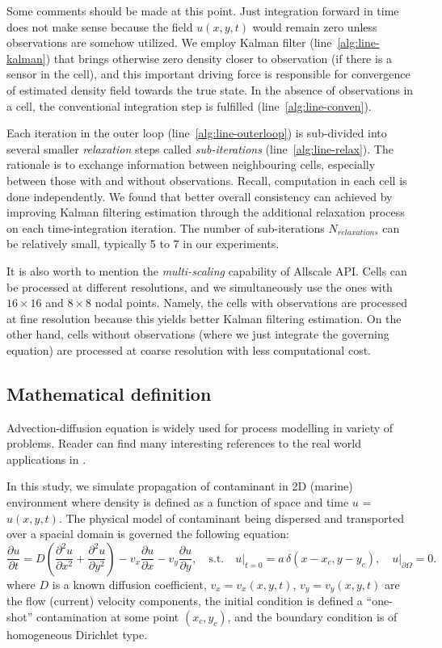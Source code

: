 \documentclass[acmsmall,review,anonymous]{acmart}\settopmatter{printfolios=true,printccs=false,printacmref=false}
\begin{document}
Some comments should be made at this point. Just integration forward in time does not make sense because the field $u(x,y,t)$ would remain zero unless observations are somehow utilized.
We employ Kalman filter (line~\ref{alg:line-kalman}) that brings otherwise zero density closer to observation (if there is a sensor in the cell), and this important driving force is responsible for convergence of estimated density field towards the true state. In the absence of observations in a cell, the conventional integration step is fulfilled (line~\ref{alg:line-conven}).

Each iteration in the outer loop (line~\ref{alg:line-outerloop}) is sub-divided into several smaller \textit{relaxation} steps called \textit{sub-iterations} (line~\ref{alg:line-relax}). The rationale is to exchange information between neighbouring cells, especially between those with and without observations. Recall, computation in each cell is done independently. We found that better overall consistency can achieved by improving Kalman filtering estimation through the additional relaxation process on each time-integration iteration. The number of sub-iterations $N_{relaxations}$ can be relatively small, typically 5 to 7 in our experiments. 

It is also worth to mention the \textit{multi-scaling} capability of Allscale API. Cells can be processed at different resolutions, and we simultaneously use the ones with $16{\times}16$ and $8{\times}8$ nodal points. Namely, the cells with observations are processed at fine resolution because this yields better Kalman filtering estimation. On the other hand, cells without observations (where we just integrate the governing equation) are processed at coarse resolution with less computational cost.

\subsection{Mathematical definition}

Advection-diffusion equation is widely used for process modelling in variety of problems. Reader can find many interesting references to the real world applications in \cite{Miyaoka17}.

In this study, we simulate propagation of contaminant in 2D (marine) environment where density is defined as a function of space and time $u$ = $u(x,y,t)$. The physical model of contaminant being dispersed and transported over a spacial domain is governed the following equation:
\begin{equation}
\frac{\partial u}{\partial t} =
D \left(\frac{\partial^2 u}{\partial x^2} + \frac{\partial^2 u}{\partial y^2}\right)
- v_x \frac{\partial u}{\partial x}
- v_y \frac{\partial u}{\partial y},
\,\,\,\,\,\,\mbox{s.t.}\,\,\,\,\,\,
u\rvert_{t=0} = a\,\delta(x\!-\!x_c,y\!-\!y_c),
\,\,\,\,\,\,u\rvert_{\partial\Omega}=0.
\label{eq:pde}
\end{equation}
where $D$ is a known diffusion coefficient, $v_x = v_x(x,y,t)$, $v_y = v_y(x,y,t)$ are the flow (current) velocity components, the initial condition is defined a ``one-shot'' contamination at some point $(x_c,y_c)$, and the boundary condition is of homogeneous Dirichlet type.
\end{document}
